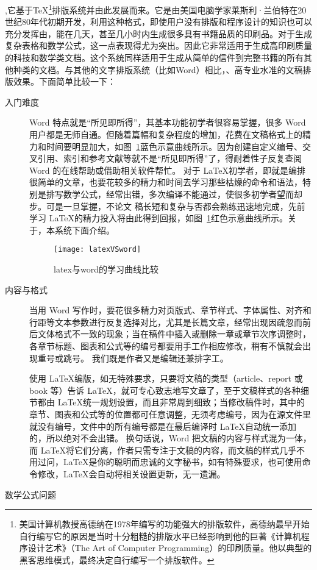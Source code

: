 ,它基于\TeX\footnote{美国计算机教授高德纳在1978年编写的功能强大的排版软件，高德纳最早开始自行编写它的原因是当时十分粗糙的排版水平已经影响到他的巨著《计算机程序设计艺术》（The Art of Computer Programming）的印刷质量。他以典型的黑客思维模式，最终决定自行编写一个排版软件。}排版系统并由此发展而来。它是由美国电脑学家莱斯利·兰伯特在20世纪80年代初期开发，利用这种格式，即使用户没有排版和程序设计的知识也可以充分发挥由，能在几天，甚至几小时内生成很多具有书籍品质的印刷品。对于生成复杂表格和数学公式，这一点表现得尤为突出。因此它非常适用于生成高印刷质量的科技和数学类文档。这个系统同样适用于生成从简单的信件到完整书籍的所有其他种类的文档。与其他的文字排版系统（比如Word）相比，、高专业水准的文稿排版效果。下面简单比较一下：
\begin{description}
\item[入门难度]  Word 特点就是“所见即所得”，其基本功能初学者很容易掌握，很多 Word 用户都是无师自通。但随着篇幅和复杂程度的增加，花费在文稿格式上的精力和时间要明显加大，如图~\ref{fig:xfig2}蓝色示意曲线所示。因为创建自定义编号、交叉引用、索引和参考文献等就不是“所见即所得”了，得耐着性子反复查阅 Word 的在线帮助或借助相关软件帮忙。
对于 \LaTeX 初学者，即就是编排很简单的文章，也要花较多的精力和时间去学习那些枯燥的命令和语法，特别是排写数学公式，经常出错，多次编译不能通过，使很多初学者望而却步。可是一旦掌握，不论文 稿长短和复杂与否都会熟练迅速地完成，先前学习 \LaTeX 的精力投入将由此得到回报，如图~\ref{fig:xfig2}红色示意曲线所示。关于，本系统下面介绍。
\begin{figure}[H]
  \centering
  \texttt{[image: latexVSword]}
  \caption{latex与word的学习曲线比较}
  \label{fig:xfig2}
\end{figure}
\item[内容与格式] 当用 Word 写作时，要花很多精力对页版式、章节样式、字体属性、对齐和行距等文本参数进行反复选择对比，尤其是长篇文章，经常出现因疏忽而前后文体格式不一致的现象；当在稿件中插入或删除一章或章节次序调整时，各章节标题、图表和公式等的编号都要用手工作相应修改，稍有不慎就会出现重号或跳号。 我们既是作者又是编辑还兼排字工。

使用 \LaTeX 编版，如无特殊要求，只要将文稿的类型（article、report 或 book 等）告诉 \LaTeX，就可专心致志地写文章了，至于文稿样式的各种细节都由 \LaTeX 统一规划设置，而且非常周到细致；当修改稿件时，其中的章节、图表和公式等的位置都可任意调整，无须考虑编号，因为在源文件里就没有编号，文件中的所有编号都是在最后编译时 \LaTeX 自动统一添加的，所以绝对不会出错。
换句话说，Word 把文稿的内容与样式混为一体，而 \LaTeX 将它们分离，作者只需专注于文稿的内容，而文稿的样式几乎不用过问，\LaTeX 是你的聪明而忠诚的文字秘书，如有特殊要求，也可使用命令修改，\LaTeX 会自动将相关设置更新，无一遗漏。
\item[数学公式问题]


\end{description}
